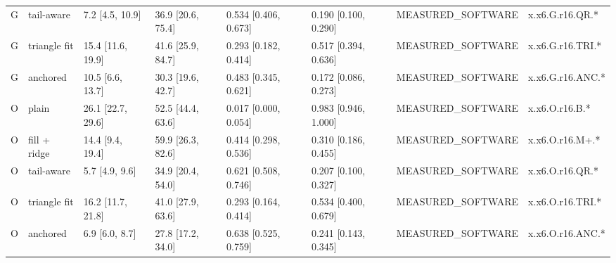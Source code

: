 \begin{table}[t]
\begin{tabular}{llllllll}
G & tail-aware & 7.2 [4.5, 10.9] & 36.9 [20.6, 75.4] & 0.534 [0.406, 0.673] & 0.190 [0.100, 0.290] & MEASURED\_SOFTWARE & x.x6.G.r16.QR.* \\
G & triangle fit & 15.4 [11.6, 19.9] & 41.6 [25.9, 84.7] & 0.293 [0.182, 0.414] & 0.517 [0.394, 0.636] & MEASURED\_SOFTWARE & x.x6.G.r16.TRI.* \\
G & anchored & 10.5 [6.6, 13.7] & 30.3 [19.6, 42.7] & 0.483 [0.345, 0.621] & 0.172 [0.086, 0.273] & MEASURED\_SOFTWARE & x.x6.G.r16.ANC.* \\
O & plain & 26.1 [22.7, 29.6] & 52.5 [44.4, 63.6] & 0.017 [0.000, 0.054] & 0.983 [0.946, 1.000] & MEASURED\_SOFTWARE & x.x6.O.r16.B.* \\
O & fill + ridge & 14.4 [9.4, 19.4] & 59.9 [26.3, 82.6] & 0.414 [0.298, 0.536] & 0.310 [0.186, 0.455] & MEASURED\_SOFTWARE & x.x6.O.r16.M+.* \\
O & tail-aware & 5.7 [4.9, 9.6] & 34.9 [20.4, 54.0] & 0.621 [0.508, 0.746] & 0.207 [0.100, 0.327] & MEASURED\_SOFTWARE & x.x6.O.r16.QR.* \\
O & triangle fit & 16.2 [11.7, 21.8] & 41.0 [27.9, 63.6] & 0.293 [0.164, 0.414] & 0.534 [0.400, 0.679] & MEASURED\_SOFTWARE & x.x6.O.r16.TRI.* \\
O & anchored & 6.9 [6.0, 8.7] & 27.8 [17.2, 34.0] & 0.638 [0.525, 0.759] & 0.241 [0.143, 0.345] & MEASURED\_SOFTWARE & x.x6.O.r16.ANC.* \\
\bottomrule
\end{tabular}
\end{table}
